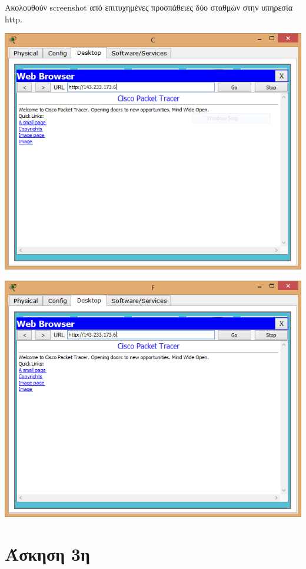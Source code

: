 \documentclass{assignment}
\begin{document}
Ακολουθούν screenshot από επιτυχημένες προσπάθειες δύο σταθμών στην υπηρεσία
http.
\begin{center}
\includegraphics[width=\textwidth, height=\textheight, keepaspectratio]{images/http1.png}
\end{center}

\begin{center}
\includegraphics[width=\textwidth, height=\textheight, keepaspectratio]{images/http2.png}
\end{center}

\section{Άσκηση 3η}
\end{document}
